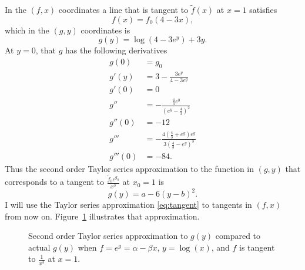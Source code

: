 \documentclass[]{article}
\begin{document}
In the $(f,x)$ coordinates a line that is tangent to $\tilde f(x)$ at
$x=1$ satisfies
\begin{equation*}
  f(x) = f_0(4-3x),
\end{equation*}
which in the $(g,y)$ coordinates is
\begin{equation*}
  g(y) = \log \left( 4 - 3e^y \right) + 3y.
\end{equation*}
At $y=0$, that $g$ has the following derivatives
\begin{align*}
  g(0) & = g_0 \\
  g'(y) &= 3 - \frac{3e^y}{4-3e^y} \\
  g'(0) &= 0 \\
  g'' &= -\frac{\frac{4}{3}e^y}{\left( e^y - \frac{4}{3} \right)^2}\\
  g''(0) &= -12 \\
  g''' &= -\frac{4\left( \frac{4}{3} + e^y \right) e^y}{
    3\left( \frac{4}{3} - e^y \right) ^3} \\
  g'''(0) &= -84.
\end{align*}
Thus the second order Taylor series approximation to the function in
$(g,y)$ that corresponds to a tangent to $\frac{\tilde f_0
  e^{g_0}}{x^3}$ at $x_0 = 1$ is
\begin{equation}
  \label{eq:tangent}
  g(y) = a - 6(y-b)^2.
\end{equation}
I will use the Taylor series approximation \eqref{eq:tangent} to
tangents in $(f,x)$ from now on.  Figure~\ref{fig:taylor} illustrates
that approximation.

\begin{figure}
  \centering
  \caption{Second order Taylor series approximation to $g(y)$ compared
    to actual $g(y)$ when $f = e^g = \alpha - \beta x$,
    $y=\log(x)$, and $f$ is tangent to $\frac{1}{x^3}$ at $x=1$.}
  \label{fig:taylor}
\end{figure}
\end{document}
